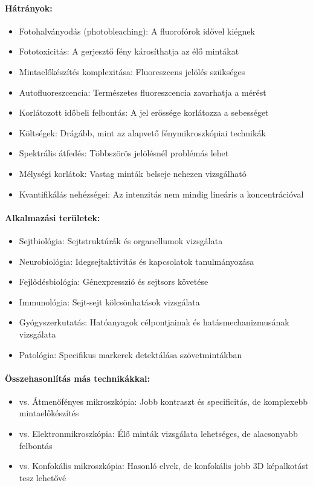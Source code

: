 \documentclass[a4paper,12pt]{article}
\begin{document}
\paragraph{Hátrányok:} \begin{itemize} \item Fotohalványodás (photobleaching): A fluorofórok idővel kiégnek \item Fototoxicitás: A gerjesztő fény károsíthatja az élő mintákat \item Mintaelőkészítés komplexitása: Fluoreszcens jelölés szükséges \item Autofluoreszcencia: Természetes fluoreszcencia zavarhatja a mérést \item Korlátozott időbeli felbontás: A jel erőssége korlátozza a sebességet \item Költségek: Drágább, mint az alapvető fénymikroszkópiai technikák \item Spektrális átfedés: Többszörös jelölésnél problémás lehet \item Mélységi korlátok: Vastag minták belseje nehezen vizsgálható \item Kvantifikálás nehézségei: Az intenzitás nem mindig lineáris a koncentrációval \end{itemize}

\paragraph{Alkalmazási területek:} \begin{itemize} \item Sejtbiológia: Sejtstruktúrák és organellumok vizsgálata \item Neurobiológia: Idegsejtaktivitás és kapcsolatok tanulmányozása \item Fejlődésbiológia: Génexpresszió és sejtsors követése \item Immunológia: Sejt-sejt kölcsönhatások vizsgálata \item Gyógyszerkutatás: Hatóanyagok célpontjainak és hatásmechanizmusának vizsgálata \item Patológia: Specifikus markerek detektálása szövetmintákban \end{itemize}

\paragraph{Összehasonlítás más technikákkal:} \begin{itemize} \item vs. Átmenőfényes mikroszkópia: Jobb kontraszt és specificitás, de komplexebb mintaelőkészítés \item vs. Elektronmikroszkópia: Élő minták vizsgálata lehetséges, de alacsonyabb felbontás \item vs. Konfokális mikroszkópia: Hasonló elvek, de konfokális jobb 3D képalkotást tesz lehetővé \end{itemize}
\end{document}
